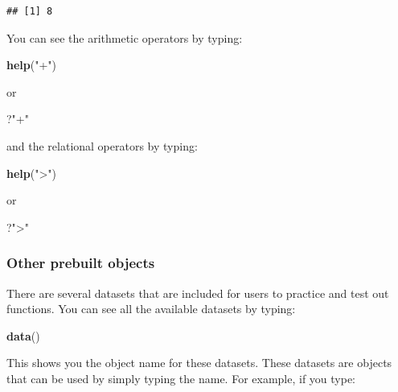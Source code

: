 \documentclass[
]{article}
\newenvironment{Shaded}{\begin{snugshade}}{\end{snugshade}}
\newcommand{\FunctionTok}[1]{\textcolor[rgb]{0.13,0.29,0.53}{\textbf{#1}}}
\newcommand{\NormalTok}[1]{#1}
\newcommand{\StringTok}[1]{\textcolor[rgb]{0.31,0.60,0.02}{#1}}
\begin{document}
\begin{verbatim}
## [1] 8
\end{verbatim}

You can see the arithmetic operators by typing:

\begin{Shaded}
\begin{Highlighting}[]
\FunctionTok{help}\NormalTok{(}\StringTok{"+"}\NormalTok{) }
\end{Highlighting}
\end{Shaded}

or

\begin{Shaded}
\begin{Highlighting}[]
\NormalTok{?}\StringTok{"+"}
\end{Highlighting}
\end{Shaded}

and the relational operators by typing:

\begin{Shaded}
\begin{Highlighting}[]
\FunctionTok{help}\NormalTok{(}\StringTok{"\textgreater{}"}\NormalTok{) }
\end{Highlighting}
\end{Shaded}

or

\begin{Shaded}
\begin{Highlighting}[]
\NormalTok{?}\StringTok{"\textgreater{}"}
\end{Highlighting}
\end{Shaded}

\subsubsection{Other prebuilt objects}\label{other-prebuilt-objects}

There are several datasets that are included for users to practice and
test out functions. You can see all the available datasets by typing:

\begin{Shaded}
\begin{Highlighting}[]
\FunctionTok{data}\NormalTok{()}
\end{Highlighting}
\end{Shaded}

This shows you the object name for these datasets. These datasets are
objects that can be used by simply typing the name. For example, if you
type:
\end{document}
